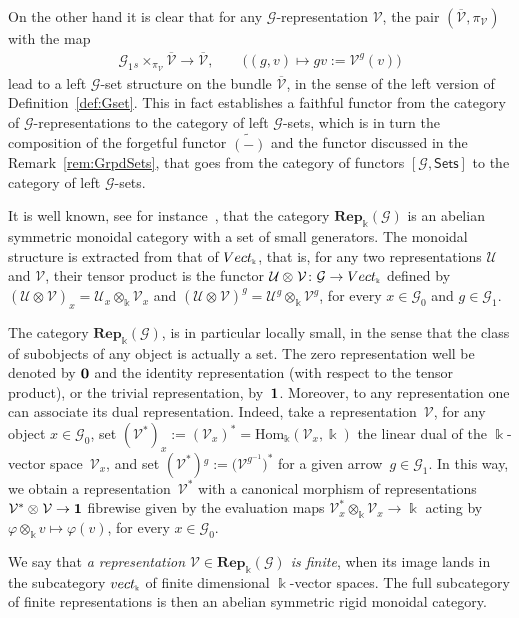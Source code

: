\documentclass[11pt]{article}
\numberwithin{equation}{section}
\newcommand{\tensor}[1]{\otimes_{\scriptscriptstyle{#1}}}
\renewcommand{\hom}[3]{\mathrm{Hom}_{\Sscript{#1}}\left(#2, #3\right)}
\newcommand{\td}[1]{\widetilde{#1}}
\newcommand{\bara}[1]{\overline{#1}}
\newcommand{\Rep}[1]{\mathbf{Rep}_{\Sscript{\Bbbk}}(#1)}
\newcommand{\Vect}{{\rm Vect}_{\Sscript{\Bbbk}}}
\newcommand{\vect}{{\rm vect}_{\Sscript{\Bbbk}}}
\newcommand{\Go}{\cG_{\Sscript{0}}}
\newcommand{\Ga}{\cG_{\Sscript{1}}}
\newcommand{\Vx}{\cV_{\Sscript{x}}}
\newcommand{\Vg}{\cV^{\Sscript{g}}}
\newcommand{\cG}{{\mathcal G}}
\newcommand{\cU}{{\mathcal U}}
\newcommand{\cV}{{\mathcal V}}
\newcommand{\Sets}{\mathsf{Sets}}
\newcommand{\Sscript}[1]{\scriptscriptstyle{#1}}
\newcommand{\due}[3]{{}_{{#2 }} {#1}_{{ #3}} }
\begin{document}
\begin{Remark}
On the other hand it is clear that for any $\cG$-representation $\cV$, the pair $(\bara{\cV}, \pi_{\Sscript{\cV}})$ with the map
\begin{gather}\label{Eq:actionV}
\Ga \due \times {\Sscript{s}} { \Sscript{\pi_{\cV}}} \bara{\cV} \longrightarrow \bara{\cV},\qquad \big((g,v) \longmapsto gv:=\Vg(v) \big)
\end{gather}
lead to a left $\cG$-set structure on the bundle $\bara{\cV}$, in the sense of the left version of Definition~\ref{def:Gset}. This in fact establishes a faithful functor from the category of $\cG$-representations to the category of left $\cG$-sets, which is in turn the composition of the forgetful functor $\td{(-)}$ and the functor discussed in the Remark~\ref{rem:GrpdSets}, that goes from the category of functors $[\cG, \Sets]$ to the category of left $\cG$-sets.
\end{Remark}

It is well known, see for instance~\cite{Mitchell:1965}, that the category $\Rep{\cG}$ is an abelian symmetric monoidal category with a set of small generators. The monoidal structure is extracted from that of $\Vect$, that is, for any two representations $\cU$ and $\cV$, their tensor product is the functor $\cU \tensor{}\cV\colon \cG \to \Vect$ defined by $(\cU\tensor{}\cV)_{\Sscript{x}}= \cU_{\Sscript{x}} \tensor{\Bbbk}\cV_{\Sscript{x}}$ and
$(\cU\tensor{}\cV)^{\Sscript{g}}= \cU^{\Sscript{g}}\tensor{\Bbbk} \cV^{\Sscript{g}}$, for every $x \in \Go$ and $g \in \Ga$.

The category $\Rep{\cG}$, is in particular locally small, in the sense that the class of subobjects of any object is actually a set. The zero representation well be denoted by $\bf 0$ and the identity representation (with respect to the tensor product), or the trivial representation, by~$\bf 1$. Moreover, to any representation one can associate its dual representation. Indeed, take a representation~$\cV$, for any object $x \in \Go$, set $(\cV^*)_{\Sscript{x}}:= (\cV_{\Sscript{x}})^*=\hom{\Bbbk}{\cV_{\Sscript{x}}}{\Bbbk}$ the linear dual of the $\Bbbk$-vector space~$\cV_{\Sscript{x}}$, and set $(\cV^*){}^g:= \big(\cV^{\Sscript{g^{-1}}}\big)^*$ for a given arrow~$g \in \Ga$. In this way, we obtain a representation~$\cV^*$ with a canonical morphism of representations $\cV^* \tensor{} \cV \to {\bf 1}$ fibrewise given by the evaluation maps $\cV^*_{\Sscript{x}} \tensor{\Bbbk} \Vx \to \Bbbk$ acting by $\varphi \tensor{\Bbbk}v \mapsto \varphi(v)$, for every $x \in \Go$.

We say that \emph{a representation $\cV \in \Rep{\cG}$ is finite}, when its image lands in the subcategory $\vect$ of finite dimensional $\Bbbk$-vector spaces. The full subcategory of finite representations is then an abelian symmetric rigid monoidal category.
\end{document}
